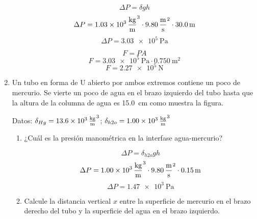 \documentclass[Física - Práctica.root.tex]{subfiles}
\begin{document}
\begin{enumerate}
        \[\Delta P=\delta gh\]
        \[\Delta P=\SI{1,03e3}{\kilogram\over\meter\cubed}\cdot\SI{9,80}{\meter\over\second\squared}\cdot\SI{30,0}{\meter}\]
        \[\Delta P=\SI{3,03e5}{\pascal}\]

        \[F=PA\]
        \[F=\SI{3,03e5}{\pascal}\cdot\SI{0,750}{\meter\squared}\]
        \[F=\boxed{\SI{2,27e5}{\newton}}\]

        \newpage

  \item Un tubo en forma de U abierto por ambos extremos contiene un poco de mercurio. Se vierte un poco de agua en el brazo izquierdo del tubo hasta que la altura de la columna de agua es \SI{15,0}{\cm} como muestra la figura.

        Datos: $\delta_{Hg}=\SI{13,6e3}{\kilogram\over\meter\cubed}$; $\delta_{h2o}=\SI{1,00e3}{\kilogram\over\meter\cubed}$

        \begin{center}
        \end{center}

        \begin{enumerate}
          \item ¿Cuál es la presión manométrica en la interfase agua-mercurio?

                \[\Delta P=\delta_{h2o}gh\]
                \[\Delta P=\SI{1,00e3}{\kilogram\over\meter\cubed}\cdot\SI{9,80}{\meter\over\second\squared}\cdot\SI{0,15}{\meter}\]
                \[\Delta P=\boxed{\SI{1,47e3}{\pascal}}\]

          \item Calcule la distancia vertical $x$ entre la superficie de mercurio en el brazo derecho del tubo y la superficie del agua en el brazo izquierdo.


\end{enumerate}
\end{enumerate}
\end{document}
